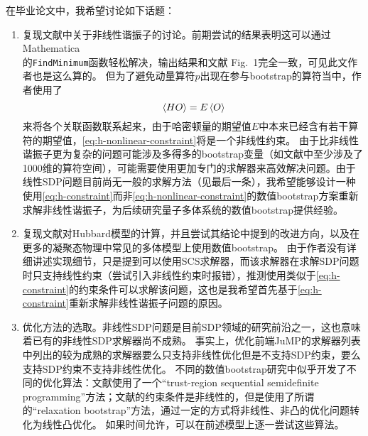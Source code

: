 \documentclass[hyperref, UTF8, a4paper]{ctexart}
\begin{document}
在毕业论文中，我希望讨论如下话题：
\begin{enumerate}
    \item 复现文献\cite{han_matrix}中关于非线性谐振子的讨论。前期尝试的结果表明这可以通过Mathematica\\
    的\texttt{FindMinimum}函数轻松解决，输出结果和文献\cite{han_matrix} Fig.~1完全一致，可见此文作者也是这么算的。
    但为了避免动量算符$p$出现在参与bootstrap的算符当中，作者使用了
    \begin{equation}
        \expval*{HO} = E \expval*{O} 
        \label{eq:h-nonlinear-constraint}
    \end{equation}
    来将各个关联函数联系起来，由于哈密顿量的期望值$E$中本来已经含有若干算符的期望值，\eqref{eq:h-nonlinear-constraint}将是一个非线性约束。
    由于比非线性谐振子更为复杂的问题可能涉及多得多的bootstrap变量（如文献\cite{han_manybody}中至少涉及了1000维的算符空间），可能需要使用更加专门的求解器来高效解决问题。由于线性SDP问题目前尚无一般的求解方法（见最后一条），我希望能够设计一种使用\eqref{eq:h-constraint}而非\eqref{eq:h-nonlinear-constraint}的数值bootstrap方案重新求解非线性谐振子，为后续研究量子多体系统的数值bootstrap提供经验。
    \item 复现文献\cite{han_manybody}对Hubbard模型的计算，并且尝试其结论中提到的改进方向，以及在更多的凝聚态物理中常见的多体模型上使用数值bootstrap。
    由于作者没有详细讲述实现细节，只是提到可以使用SCS求解器\cite{scs}，而该求解器在求解SDP问题时只支持线性约束（尝试引入非线性约束时报错），推测使用类似于\eqref{eq:h-constraint}的约束条件可以求解该问题，这也是我希望首先基于\eqref{eq:h-constraint}重新求解非线性谐振子问题的原因。
    \item 优化方法的选取。非线性SDP问题是目前SDP领域的研究前沿之一\cite{Bofill_2014}，这也意味着已有的非线性SDP求解器尚不成熟\cite{kazakov2021analytic}。
    事实上，优化前端JuMP\cite{jump}的求解器列表中列出的较为成熟的求解器要么只支持非线性优化但是不支持SDP约束，要么支持SDP约束不支持非线性优化。
    不同的数值bootstrap研究中似乎开发了不同的优化算法：文献\cite{han_matrix}使用了一个``trust-region sequential semidefinite programming''方法；文献\cite{kazakov2021analytic}的约束条件是非线性的，但是使用了所谓的``relaxation bootstrap''方法，通过一定的方式将非线性、非凸的优化问题转化为线性凸优化。
    如果时间允许，可以在前述模型上逐一尝试这些算法。
\end{enumerate}



\end{document}

